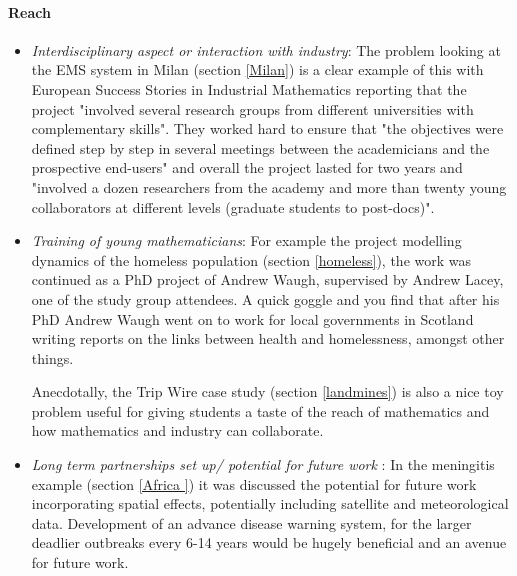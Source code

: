 \documentclass[11pt]{article} %
\begin{document}
\paragraph{Reach}
\begin{itemize}
	\item \textit{Interdisciplinary aspect or interaction with industry}: The problem looking at the EMS system in Milan (section \ref{Milan}) is a clear example of this with European Success Stories in Industrial Mathematics \cite{European2011} reporting that the project "involved several research groups from different universities with complementary skills". They worked hard to ensure that "the objectives were defined step by step in several meetings between the academicians and the prospective end-users" and overall the project lasted for two years and "involved a dozen researchers from the academy and more than twenty young collaborators at different levels (graduate students to post-docs)".
	\item \textit{Training of young mathematicians}: For example the project modelling dynamics of the homeless population (section \ref{homeless}), the work was continued as a PhD project of Andrew Waugh, supervised by Andrew Lacey, one of the study group attendees. A quick goggle and you find that after his PhD Andrew Waugh went on to work for local governments in Scotland writing reports on the links between health and homelessness, amongst other things.
	
	Anecdotally, the Trip Wire case study (section \ref{landmines}) is also a nice toy problem useful for giving students a taste of the reach of mathematics and how mathematics and industry can collaborate. 
	\item \textit{Long term partnerships set up/ potential for future work }: In the meningitis example (section \ref{Africa }) it was discussed the potential for future work incorporating  spatial effects, potentially including satellite and meteorological data. Development of an advance disease warning system, for the larger deadlier outbreaks every 6-14 years would be hugely beneficial and an avenue for future work. 
\end{itemize}
	 
\end{document}
